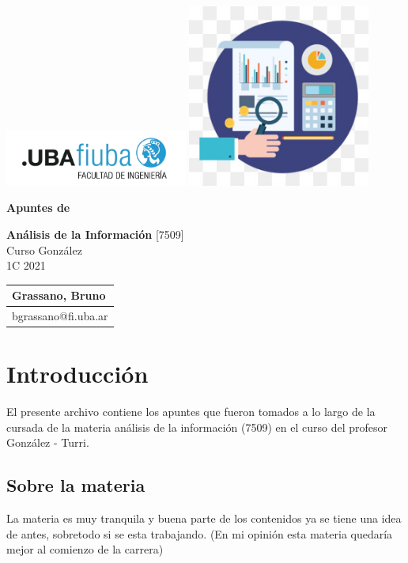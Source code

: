\documentclass[titlepage,a4paper]{article}
\begin{document}
\begin{titlepage} %
	\hfill\includegraphics[width=6cm]{logofiuba.jpg}
    \centering
    \vfill
    \includegraphics[width=6cm]{Imagenes/logo.jpg}
    
    \Huge \textbf{Apuntes de}
    
    \Huge \textbf{Análisis de la Información}
    \vskip2cm
    \Large [7509]\\
    Curso González \\
    1C 2021 
    \vfill
    \begin{tabular}{ | l | }
      \hline
      Grassano, Bruno \\ \hline
      bgrassano@fi.uba.ar \\ \hline
  	\end{tabular}
    \vfill
    \vfill
\end{titlepage}

\tableofcontents %

\newpage

\section{Introducción}\label{sec:intro}
El presente archivo contiene los apuntes que fueron tomados a lo largo de la cursada de la materia análisis de la información (7509) en el curso del profesor González - Turri.

\subsection*{Sobre la materia}
La materia es muy tranquila y buena parte de los contenidos ya se tiene una idea de antes, sobretodo si se esta trabajando. (En mi opinión esta materia quedaría mejor al comienzo de la carrera)
\end{document}
